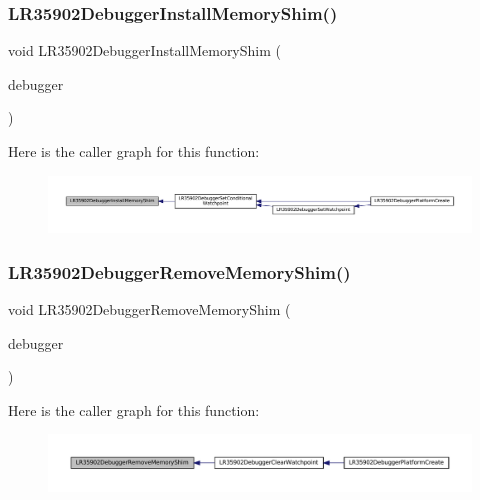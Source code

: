 \subsubsection{\texorpdfstring{L\+R35902\+Debugger\+Install\+Memory\+Shim()}{LR35902DebuggerInstallMemoryShim()}}
{\footnotesize\ttfamily void L\+R35902\+Debugger\+Install\+Memory\+Shim (\begin{DoxyParamCaption}\item[{struct L\+R35902\+Debugger $\ast$}]{debugger }\end{DoxyParamCaption})}

Here is the caller graph for this function\+:
\nopagebreak
\begin{figure}[H]
\begin{center}
\leavevmode
\includegraphics[width=350pt]{lr35902_2debugger_2memory-debugger_8c_a0bd5023fb705b2c236d1d7d914e065fa_icgraph}
\end{center}
\end{figure}
\mbox{\label{lr35902_2debugger_2memory-debugger_8c_a2c84c9eab16fbb97967df0f2fd5b7614}} 
\subsubsection{\texorpdfstring{L\+R35902\+Debugger\+Remove\+Memory\+Shim()}{LR35902DebuggerRemoveMemoryShim()}}
{\footnotesize\ttfamily void L\+R35902\+Debugger\+Remove\+Memory\+Shim (\begin{DoxyParamCaption}\item[{struct L\+R35902\+Debugger $\ast$}]{debugger }\end{DoxyParamCaption})}

Here is the caller graph for this function\+:
\nopagebreak
\begin{figure}[H]
\begin{center}
\leavevmode
\includegraphics[width=350pt]{lr35902_2debugger_2memory-debugger_8c_a2c84c9eab16fbb97967df0f2fd5b7614_icgraph}
\end{center}
\end{figure}
